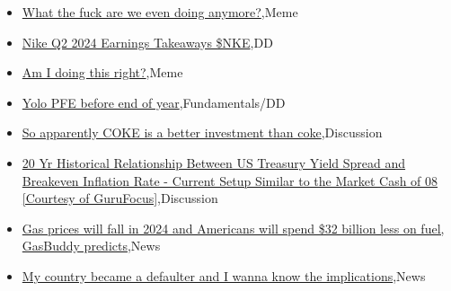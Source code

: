 \documentclass{article}%
\begin{document}
%
\begin{itemize}%
\item%
\href{https://reddit.com/r/wallstreetbets/comments/18ss5cz/what\_the\_fuck\_are\_we\_even\_doing\_anymore/}{What the fuck are we even doing anymore?},Meme%
\item%
\href{https://reddit.com/r/wallstreetbets/comments/18src1a/nike\_q2\_2024\_earnings\_takeaways\_nke/}{Nike Q2 2024 Earnings Takeaways \$NKE},DD%
\item%
\href{https://reddit.com/r/wallstreetbets/comments/18sn1yi/am\_i\_doing\_this\_right/}{Am I doing this right?},Meme%
\item%
\href{https://reddit.com/r/StockMarket/comments/18sgh8z/yolo\_pfe\_before\_end\_of\_year/}{Yolo PFE before end of year},Fundamentals/DD%
\item%
\href{https://reddit.com/r/StockMarket/comments/18sf44h/so\_apparently\_coke\_is\_a\_better\_investment\_than/}{So apparently COKE is a better investment than coke},Discussion%
\item%
\href{https://reddit.com/r/StockMarket/comments/18s7ang/20\_yr\_historical\_relationship\_between\_us\_treasury/}{20 Yr Historical Relationship Between US Treasury Yield Spread and Breakeven Inflation Rate - Current Setup Similar to the Market Cash of 08 [Courtesy of GuruFocus]},Discussion%
\item%
\href{https://reddit.com/r/Economics/comments/18sqgpt/gas\_prices\_will\_fall\_in\_2024\_and\_americans\_will/}{Gas prices will fall in 2024 and Americans will spend \$32 billion less on fuel, GasBuddy predicts},News%
\item%
\href{https://reddit.com/r/Economics/comments/18skzre/my\_country\_became\_a\_defaulter\_and\_i\_wanna\_know/}{My country  became a defaulter and I wanna know the implications},News%
\end{itemize}%
\end{document}
